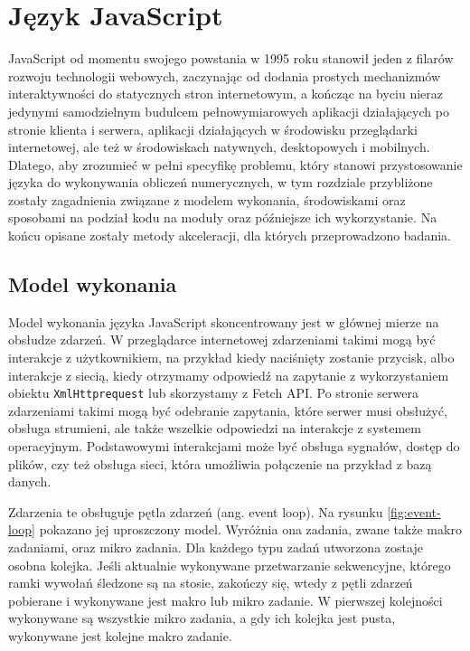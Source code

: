 \chapter{Język JavaScript}

JavaScript od momentu swojego powstania w 1995 roku stanowił jeden z filarów rozwoju technologii webowych, zaczynając od dodania prostych mechanizmów interaktywności do statycznych stron internetowym, a kończąc na byciu nieraz jedynymi samodzielnym budulcem pełnowymiarowych aplikacji działających po stronie klienta i serwera, aplikacji działających w środowisku przeglądarki internetowej, ale też w środowiskach natywnych, desktopowych i mobilnych. Dlatego, aby zrozumieć w pełni specyfikę problemu, który stanowi przystosowanie języka do wykonywania obliczeń numerycznych, w tym rozdziale przybliżone zostały zagadnienia związane z modelem wykonania, środowiskami oraz sposobami na podział kodu na moduły oraz późniejsze ich wykorzystanie. Na końcu opisane zostały metody akceleracji, dla których przeprowadzono badania.



\section{Model wykonania}

Model wykonania języka JavaScript skoncentrowany jest w głównej mierze na obsłudze zdarzeń. W przeglądarce internetowej zdarzeniami takimi mogą być interakcje z użytkownikiem, na przykład kiedy naciśnięty zostanie przycisk, albo interakcje z siecią, kiedy otrzymamy odpowiedź na zapytanie z wykorzystaniem obiektu \lstinline{XmlHttprequest} lub skorzystamy z Fetch API. Po stronie serwera zdarzeniami takimi mogą być odebranie zapytania, które serwer musi obsłużyć, obsługa strumieni, ale także wszelkie odpowiedzi na interakcje z systemem operacyjnym. Podstawowymi interakcjami może być obsługa sygnałów, dostęp do plików, czy też obsługa sieci, która umożliwia połączenie na przykład z bazą danych.

Zdarzenia te obsługuje pętla zdarzeń (ang. event loop). Na rysunku \ref{fig:event-loop} pokazano jej uproszczony model. Wyróżnia ona zadania, zwane także makro zadaniami, oraz mikro zadania. Dla każdego typu zadań utworzona zostaje osobna kolejka. Jeśli aktualnie wykonywane przetwarzanie sekwencyjne, którego ramki wywołań śledzone są na stosie, zakończy się, wtedy z pętli zdarzeń pobierane i wykonywane jest makro lub mikro zadanie. W pierwszej kolejności wykonywane są wszystkie mikro zadania, a gdy ich kolejka jest pusta, wykonywane jest kolejne makro zadanie.

